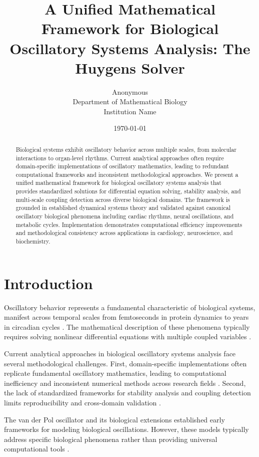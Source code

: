 \documentclass[twocolumn]{article}
\title{A Unified Mathematical Framework for Biological Oscillatory Systems Analysis: The Huygens Solver}
\author{
Anonymous\\
Department of Mathematical Biology\\
Institution Name
}
\date{\today}
\begin{document}
\maketitle

\begin{abstract}
Biological systems exhibit oscillatory behavior across multiple scales, from molecular interactions to organ-level rhythms. Current analytical approaches often require domain-specific implementations of oscillatory mathematics, leading to redundant computational frameworks and inconsistent methodological approaches. We present a unified mathematical framework for biological oscillatory systems analysis that provides standardized solutions for differential equation solving, stability analysis, and multi-scale coupling detection across diverse biological domains. The framework is grounded in established dynamical systems theory and validated against canonical oscillatory biological phenomena including cardiac rhythms, neural oscillations, and metabolic cycles. Implementation demonstrates computational efficiency improvements and methodological consistency across applications in cardiology, neuroscience, and biochemistry.
\end{abstract}

\section{Introduction}

Oscillatory behavior represents a fundamental characteristic of biological systems, manifest across temporal scales from femtoseconds in protein dynamics to years in circadian cycles \citep{glass2001synchronization,strogatz2003sync}. The mathematical description of these phenomena typically requires solving nonlinear differential equations with multiple coupled variables \citep{murray2002mathematical,keener2009mathematical}.

Current analytical approaches in biological oscillatory systems analysis face several methodological challenges. First, domain-specific implementations often replicate fundamental oscillatory mathematics, leading to computational inefficiency and inconsistent numerical methods across research fields \citep{ermentrout2010mathematical}. Second, the lack of standardized frameworks for stability analysis and coupling detection limits reproducibility and cross-domain validation \citep{pikovsky2001synchronization}.

The van der Pol oscillator \citep{vanderpol1926frequency} and its biological extensions \citep{fitzhugh1961impulses,nagumo1962active} established early frameworks for modeling biological oscillations. However, these models typically address specific biological phenomena rather than providing universal computational tools \citep{izhikevich2007dynamical}.
\end{document}
